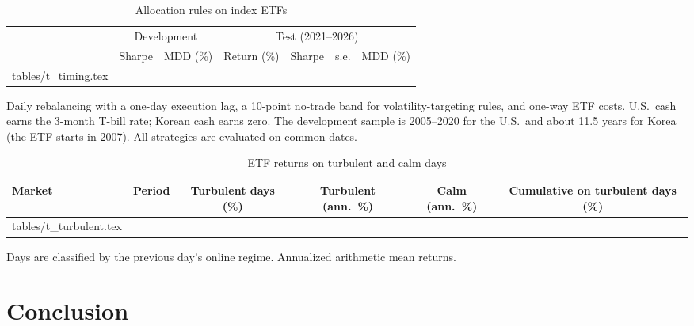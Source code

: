 \documentclass[11pt]{article}
\makeatletter
\newcommand\inputtable[1]{\@@input #1 }
\makeatother
\begin{document}
\begin{table}[!htbp]
\centering
\begin{threeparttable}
\caption{Allocation rules on index ETFs}\label{tab:timing}
\scriptsize
\begin{tabular}{lcccccc}
\toprule
 & \multicolumn{2}{c}{Development} & \multicolumn{4}{c}{Test (2021--2026)} \\
\cmidrule(lr){2-3}\cmidrule(lr){4-7}
 & Sharpe & MDD (\%) & Return (\%) & Sharpe & s.e. & MDD (\%) \\
\midrule
\inputtable{tables/t_timing.tex}
\bottomrule
\end{tabular}
\begin{tablenotes}\footnotesize
\item Daily rebalancing with a one-day execution lag, a 10-point no-trade band for volatility-targeting rules, and one-way ETF costs. U.S.\ cash earns the 3-month T-bill rate; Korean cash earns zero. The development sample is 2005--2020 for the U.S.\ and about 11.5 years for Korea (the ETF starts in 2007). All strategies are evaluated on common dates.
\end{tablenotes}
\end{threeparttable}
\end{table}

\begin{table}[!htbp]
\centering
\begin{threeparttable}
\caption{ETF returns on turbulent and calm days}\label{tab:turbulent}
\small
\begin{tabular}{llcccc}
\toprule
Market & Period & Turbulent days (\%) & Turbulent (ann.\ \%) & Calm (ann.\ \%) & Cumulative on turbulent days (\%) \\
\midrule
\inputtable{tables/t_turbulent.tex}
\bottomrule
\end{tabular}
\begin{tablenotes}\footnotesize
\item Days are classified by the previous day's online regime. Annualized arithmetic mean returns.
\end{tablenotes}
\end{threeparttable}
\end{table}

\section{Conclusion}\label{sec:conclusion}
\end{document}
